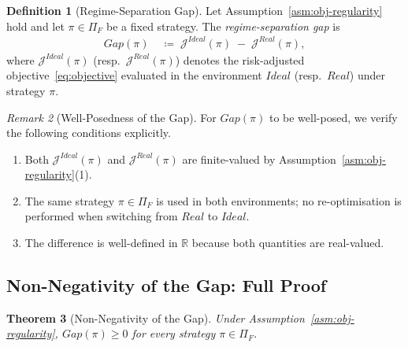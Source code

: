 \documentclass[12pt,openany]{book}
\numberwithin{equation}{chapter}
\theoremstyle{plain}
\newtheorem{theorem}{Theorem}[chapter]
\theoremstyle{definition}
\newtheorem{definition}[theorem]{Definition}
\theoremstyle{remark}
\newtheorem{remark}[theorem]{Remark}
\numberwithin{equation}{chapter}
\theoremstyle{plain}
\newcommand{\Ideal}{\mathcal{E}_{I}}
\newcommand{\Real}{\mathcal{E}_{R}}
\newcommand{\Gap}{\mathcal{G}}
\def\Ideal{Ideal}%
\def\Real{Real}%
\def\Gap{Gap}%
\begin{document}
\begin{definition}[Regime-Separation Gap]
\label{def:gap}
Let Assumption~\ref{asm:obj-regularity} hold and let
$\pi \in \Pi_F$ be a fixed strategy.  The
\emph{regime-separation gap} is
\begin{align}
  \Gap(\pi)
  &\;\coloneqq\;
  \mathcal{J}^{\Ideal}(\pi) \;-\; \mathcal{J}^{\Real}(\pi),
  \label{eq:gap}
\end{align}
where $\mathcal{J}^{\Ideal}(\pi)$ (resp.\ $\mathcal{J}^{\Real}(\pi)$)
denotes the risk-adjusted objective~\eqref{eq:objective} evaluated
in the environment $\Ideal$ (resp.\ $\Real$) under strategy $\pi$.
\end{definition}

\begin{remark}[Well-Posedness of the Gap]
\label{rem:gap-wellposed}
For $\Gap(\pi)$ to be well-posed, we verify the following
conditions explicitly.
\begin{enumerate}
  \item Both $\mathcal{J}^{\Ideal}(\pi)$ and
        $\mathcal{J}^{\Real}(\pi)$ are finite-valued by
        Assumption~\ref{asm:obj-regularity}(1).
  \item The same strategy $\pi \in \Pi_F$ is used in both
        environments; no re-optimisation is performed when
        switching from $\Real$ to $\Ideal$.
  \item The difference is well-defined in $\mathbb{R}$ because
        both quantities are real-valued.
\end{enumerate}
\end{remark}

\subsection{Non-Negativity of the Gap: Full Proof}

\begin{theorem}[Non-Negativity of the Gap]
\label{thm:gap-nonneg}
Under Assumption~\ref{asm:obj-regularity}, $\Gap(\pi) \geq 0$
for every strategy $\pi \in \Pi_F$.
\end{theorem}
\end{document}
